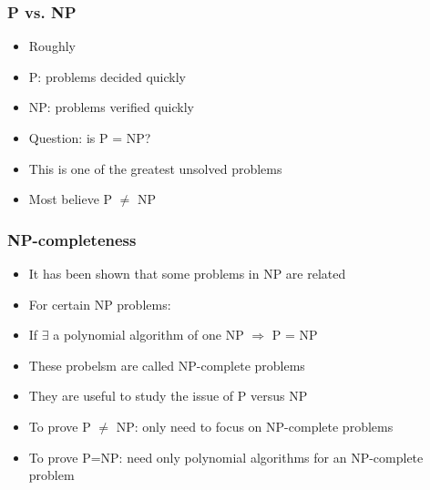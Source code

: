 \begin{frame}[allowframebreaks] \frametitle{P vs. NP}
  \begin{itemize}
\item Roughly

\item [] P: problems decided quickly

\item [] NP: problems verified quickly
\item Question: is P = NP?

\item [] This is one of the greatest unsolved problems

\item Most believe P $\neq $ NP
\end{itemize}\end{frame} \begin{frame}[allowframebreaks] \frametitle{NP-completeness}
  \begin{itemize}
\item It has been shown that some problems in NP are related

\item For certain NP problems:

\item [] If $\exists$ a polynomial algorithm of one NP $\Rightarrow$ P = NP

\item These probelsm are called NP-complete problems
\item They are useful to study the issue of P versus NP
\item To prove P $\neq$ NP: only need to focus on
NP-complete problems
\item To prove P=NP: need only polynomial algorithms
for an NP-complete problem
\end{itemize}
\end{frame}

